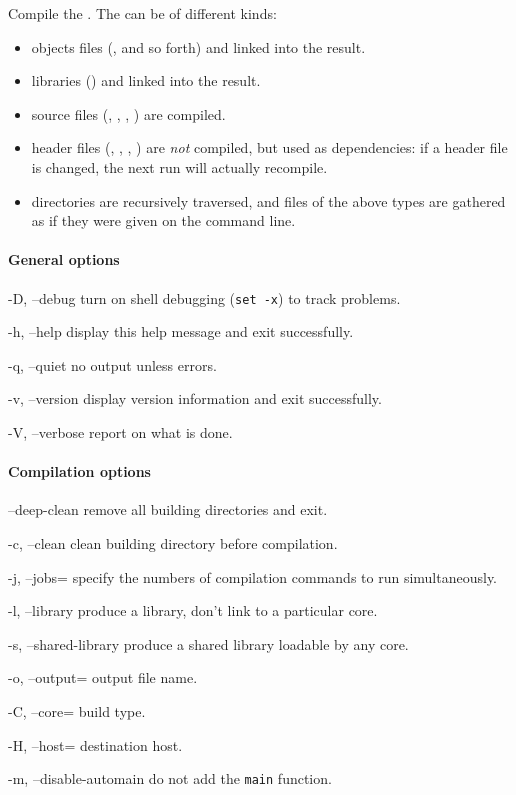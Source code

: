 Compile the .  The  can be of different kinds:
\begin{itemize}
\item objects files (,  and so forth) and linked
  into the result.
\item libraries () and linked into the result.
\item source files (, , , )
  are compiled.
\item header files (, , ,
  ) are \emph{not} compiled, but used as dependencies: if
  a header file is changed, the next  run will actually
  recompile.
\item directories are recursively traversed, and files of the above
  types are gathered as if they were given on the command line.
\end{itemize}

\paragraph{General options}
\begin{options}
\item[-D, --debug] turn on shell debugging (\lstinline|set -x|) to
  track  problems.
\item[-h, --help] display this help message and exit successfully.
\item[-q, --quiet] no output unless errors.
\item[-v, --version] display version information and exit successfully.
\item[-V, --verbose] report on what is done.
\end{options}

\paragraph{Compilation options}
\begin{options}
\item[--deep-clean] remove all building directories and exit.
\item[-c, --clean] clean building directory before compilation.
\item[-j, --jobs=\var{jobs}] specify the numbers of compilation
  commands to run simultaneously.
\item[-l, --library] produce a library, don't link to a particular
  core.
\item[-s, --shared-library] produce a shared library loadable by any
  core.
\item[-o, --output=\var{output}] output file name.
\item[-C, --core=\var{core}] build type.
\item[-H, --host=\var{host}] destination host.
\item[-m, --disable-automain] do not add the \lstinline|main| function.
\end{options}

